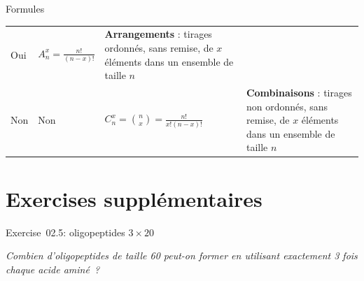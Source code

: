 \documentclass[ignorenonframetext,]{beamer}
\begin{document}
\begin{frame}{Formules}
\begin{longtable}[]{@{}llll@{}}
\begin{minipage}[t]{0.10\columnwidth}
Oui\strut
\end{minipage} & \begin{minipage}[t]{0.18\columnwidth}\raggedright
\(A^x_n = \frac{n!}{(n-x)!}\)\strut
\end{minipage} & \begin{minipage}[t]{0.49\columnwidth}\raggedright
\textbf{Arrangements} : tirages ordonnés, sans remise, de \(x\) éléments
dans un ensemble de taille \(n\)\strut
\end{minipage}\tabularnewline
\begin{minipage}[t]{0.12\columnwidth}\raggedright
Non\strut
\end{minipage} & \begin{minipage}[t]{0.10\columnwidth}\raggedright
Non\strut
\end{minipage} & \begin{minipage}[t]{0.18\columnwidth}\raggedright
\(C^x_n = \binom{n}{x} = \frac{n!}{x! (n - x) !}\)\strut
\end{minipage} & \begin{minipage}[t]{0.49\columnwidth}\raggedright
\textbf{Combinaisons} : tirages non ordonnés, sans remise, de \(x\)
éléments dans un ensemble de taille \(n\)\strut
\end{minipage}\tabularnewline
\bottomrule
\end{longtable}

\end{frame}

\hypertarget{exercises-supplementaires}{%
\section{Exercises supplémentaires}\label{exercises-supplementaires}}

\begin{frame}{Exercise~02.5: oligopeptides \(3 \times 20\)}
\protect\hypertarget{exercise02.5-oligopeptides-3-times-20}{}

\emph{Combien d'oligopeptides de taille 60 peut-on former en utilisant
exactement 3 fois chaque acide aminé~?}

\end{frame}
\end{document}
